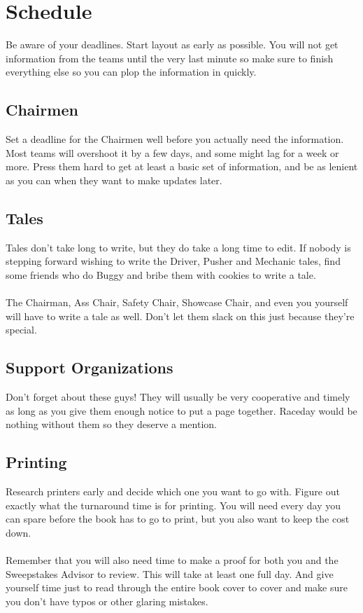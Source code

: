 \section{Schedule}
Be aware of your deadlines. Start layout as early as possible. You
will not get information from the teams until the very last minute so make
sure to finish everything else so you can plop the information in quickly.

\subsection{Chairmen}
Set a deadline for the Chairmen well before you actually need the information.
Most teams will overshoot it by a few days, and some might lag for a week or
more. Press them hard to get at least a basic set of information, and be as
lenient as you can when they want to make updates later.

\subsection{Tales}
Tales don't take long to write, but they do take a long time to edit. If
nobody is stepping forward wishing to write the Driver, Pusher and Mechanic
tales, find some friends who do Buggy and bribe them with cookies to write a
tale.
\\\\
The Chairman, Ass Chair, Safety Chair, Showcase Chair, and even you yourself
will have to write a tale as well. Don't let them slack on this just because
they're special.

\subsection{Support Organizations}
Don't forget about these guys! They will usually be very cooperative and
timely as long as you give them enough notice to put a page together.
Raceday would be nothing without them so they deserve a mention.

\subsection{Printing}
Research printers early and decide which one you want to go with. Figure out
exactly what the turnaround time is for printing. You will need every day you
can spare before the book has to go to print, but you also want to keep the
cost down.
\\\\
Remember that you will also need time to make a proof for both you and the
Sweepstakes Advisor to review. This will take at least one full day. And
give yourself time just to read through the entire book cover to cover
and make sure you don't have typos or other glaring mistakes.
